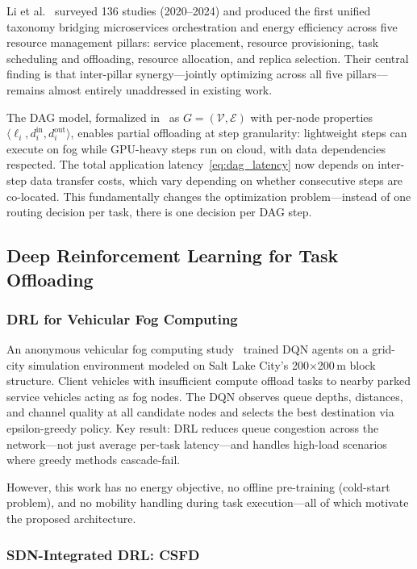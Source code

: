 \documentclass[12pt,a4paper]{article}
\begin{document}
Li et al.~\cite{li2025microservice} surveyed 136 studies (2020--2024) and produced
the first unified taxonomy bridging microservices orchestration and energy
efficiency across five resource management pillars: service placement, resource
provisioning, task scheduling and offloading, resource allocation, and replica
selection. Their central finding is that inter-pillar synergy---jointly optimizing
across all five pillars---remains almost entirely unaddressed in existing work.

The DAG model, formalized in~\cite{zhu2025dag} as $G = (\mathcal{V}, \mathcal{E})$
with per-node properties $\langle \ell_i, d_i^{\text{in}}, d_i^{\text{out}}
\rangle$, enables partial offloading at step granularity: lightweight steps can
execute on fog while GPU-heavy steps run on cloud, with data dependencies
respected. The total application latency~\eqref{eq:dag_latency} now depends on
inter-step data transfer costs, which vary depending on whether consecutive steps
are co-located. This fundamentally changes the optimization problem---instead of
one routing decision per task, there is one decision per DAG step.

\subsection{Deep Reinforcement Learning for Task Offloading}

\subsubsection{DRL for Vehicular Fog Computing}

An anonymous vehicular fog computing study~\cite{vfc_drl2024} trained DQN agents
on a grid-city simulation environment modeled on Salt Lake City's 200$\times$200\,m
block structure. Client vehicles with insufficient compute offload tasks to nearby
parked service vehicles acting as fog nodes. The DQN observes queue depths,
distances, and channel quality at all candidate nodes and selects the best
destination via epsilon-greedy policy. Key result: DRL reduces queue congestion
across the network---not just average per-task latency---and handles high-load
scenarios where greedy methods cascade-fail.

However, this work has no energy objective, no offline pre-training (cold-start
problem), and no mobility handling during task execution---all of which motivate
the proposed architecture.

\subsubsection{SDN-Integrated DRL: CSFD}
\end{document}
